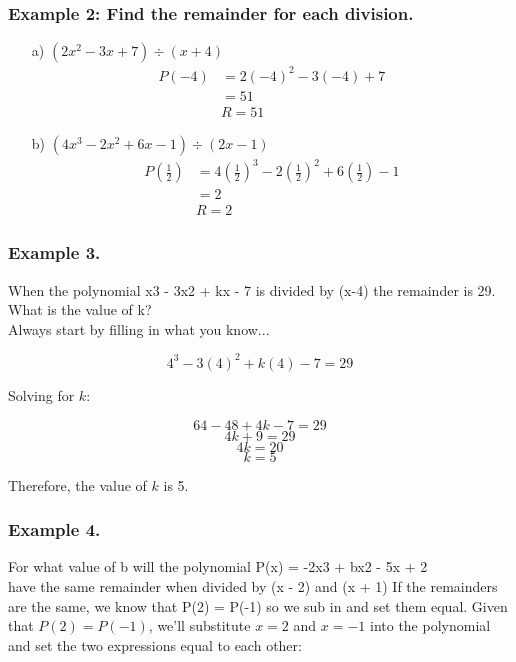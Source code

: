 \documentclass{article}
\begin{document}
\subsubsection*{Example 2: Find the remainder for each division.}
\begin{enumerate}
    \item[a)] $\left( 2x^2-3x+7\right)\div (x+4)$ \\
    \begin{align*}
    P(-4)&=2(-4)^2-3(-4)+7\\
    &=51\\
    &\boxed{R= 51}
    \end{align*}
    \item[b)] $\left( 4x^3-2x^2+6x-1\right) \div (2x-1)$ \\
    \begin{align*}
        P\left(\frac{1}{2}\right)&=4\left(\frac{1}{2}\right)^3-2\left(\frac{1}{2}\right)^2+6\left(\frac{1}{2}\right)-1\\
        &= 2\\
        &\boxed{R=2}
    \end{align*}
\end{enumerate}

\subsubsection*{Example 3.} When the polynomial x3 - 3x2 + kx - 7 is divided by (x-4) the
remainder is 29. What is the value of k?\\
Always start by filling in what you know...

\[ 4^3 - 3(4)^2 + k(4) - 7 = 29 \]

Solving for \( k \):

\[ 64 - 48 + 4k - 7 = 29 \]
\[ 4k + 9 = 29 \]
\[ 4k = 20 \]
\[ k = 5 \]

Therefore, the value of \( k \) is 5.

\newpage
\subsubsection*{Example 4.} For what value of b will the polynomial P(x) = -2x3 + bx2 - 5x + 2\\
have the same remainder when divided by (x - 2) and (x + 1)
If the remainders are the same, we know that P(2) = P(-1) so we sub in and
set them equal.
Given that \( P(2) = P(-1) \), we'll substitute \( x = 2 \) and \( x = -1 \) into the polynomial and set the two expressions equal to each other: \\
\end{document}
